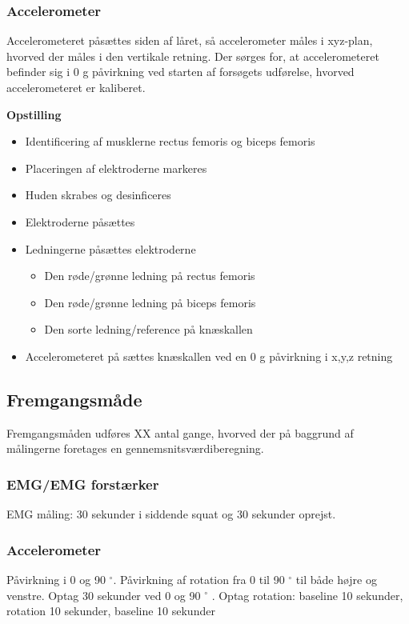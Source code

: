 \subsubsection{Accelerometer}
Accelerometeret påsættes siden af låret, så accelerometer måles i xyz-plan, hvorved der måles i den vertikale retning. Der sørges for,  at accelerometeret befinder sig i 0 g påvirkning ved starten af forsøgets udførelse, hvorved accelerometeret er kaliberet. 

\textbf{Opstilling}
\begin{itemize}
\item Identificering af musklerne rectus femoris og biceps femoris 
\item Placeringen af elektroderne markeres
\item Huden skrabes og desinficeres
\item Elektroderne påsættes
\item Ledningerne påsættes elektroderne
\begin{itemize}
\item Den røde/grønne ledning på rectus femoris
\item Den røde/grønne ledning på biceps femoris
\item Den sorte ledning/reference på knæskallen 
\end{itemize} 
\item Accelerometeret på sættes knæskallen ved en 0 g påvirkning i x,y,z retning
\end{itemize}


\subsection{Fremgangsmåde}
Fremgangsmåden udføres XX antal gange, hvorved der på baggrund af målingerne foretages en gennemsnitsværdiberegning.

\subsubsection{EMG/EMG forstærker}
EMG måling: 30 sekunder i siddende squat og 30 sekunder oprejst.

\subsubsection{Accelerometer}
Påvirkning i 0 og 90 $^{\circ}$.
Påvirkning af rotation fra 0 til 90 $^{\circ}$ til både højre og venstre.
Optag 30 sekunder ved 0 og 90 $^{\circ}$ .
Optag rotation: baseline 10 sekunder, rotation 10 sekunder, baseline 10 sekunder




